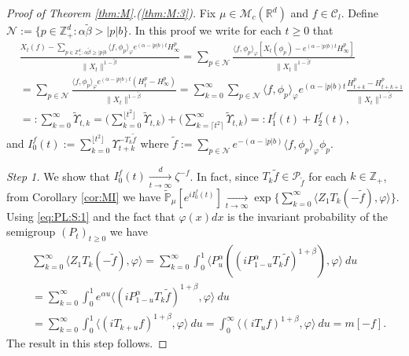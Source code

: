 \documentclass[12pt,a4paper]{amsart}
\theoremstyle{plain}
\theoremstyle{definition}
\numberwithin{equation}{section}
\begin{document}
\begin{proof}[Proof of Theorem \ref{thm:M}.(\ref{thm:M:3})]
Fix $\mu \in \mathcal M_c(\mathbb R^d)$ and $f \in \mathcal C_l$.
Define $\mathcal N:= \{p\in \mathbb Z_+^d: \alpha \tilde \beta > |p|b\}$.
In this proof we write for each $t\geq 0$ that
\begin{align}
  & \frac{X_t(f) - \sum_{p\in \mathbb Z_+^d: \alpha \tilde \beta \geq |p|b} \langle f,\phi_p\rangle_\varphi e^{(\alpha - |p|b)t}H_\infty^p}{\|X_t\|^{1- \tilde \beta}}
    = \sum_{p\in \mathcal N}\frac{ \langle f,\phi_p\rangle_\varphi [X_t(\phi_p) - e^{(\alpha - |p|b)t}H_\infty^p]}{\|X_t\|^{1- \tilde \beta}}
  \\& = \sum_{p \in \mathcal N} \frac{\langle f,\phi_p\rangle_\varphi e^{(\alpha - |p|b)t}(H_t^p - H_\infty^p)}{\|X_t\|^{1- \tilde \beta}}
   = \sum_{k=0}^\infty \sum_{p \in \mathcal N}  \langle f,\phi_p\rangle_\varphi e^{(\alpha - |p|b)t}\frac{ H_{t+k}^p - H_{t+k+1}^p}{\|X_t\|^{1- \tilde \beta}}
  \\ & =: \sum_{k=0}^\infty \widetilde \Upsilon_{t,k}
  = \Big(\sum_{k = 0}^{\lfloor t^2 \rfloor}  \widetilde \Upsilon_{t,k} \Big) + \Big(\sum_{k = \lceil t^2 \rceil}^\infty  \widetilde \Upsilon_{t,k}\Big)
  = : I^f_1(t) + I^f_2(t),
\end{align}
and $I^f_0(t):= \sum_{k = 0}^{\lfloor t^2 \rfloor} \Upsilon_{t+k}^{- T_k \tilde f}$ where $\tilde f := \sum_{p\in \mathcal N} e^{-(\alpha - |p|b)}\langle f, \phi_p \rangle_\varphi \phi_p$.

\emph{Step 1.} We show that $I^f_0(t) \xrightarrow [t\to \infty]{d} \zeta^{-f}$.
In fact, since $T_k\tilde f \in \mathcal P_{\tilde f}$ for each $k\in \mathbb Z_+$, from Corollary \ref{cor:MI} we have $\widetilde{ \mathbb P}_\mu[e^{i I_0^f(t)}]\xrightarrow[t\to \infty]{}\exp\{\sum_{k=0}^\infty \langle Z_1T_k(-\tilde f),\varphi\rangle\}$.
Using \eqref{eq:PL:S:1} and the fact that $\varphi(x)dx$ is the invariant probability
of the semigroup $(P_t)_{t\geq 0}$ we have
\begin{align}
  \label{eq:PM:CLTS:2}
  & \sum_{k=0}^\infty \langle Z_1 T_{k} (-\tilde f), \varphi \rangle
    = \sum_{k=0}^\infty \int_0^1 \langle P_u^\alpha ((iP_{1 - u}^\alpha T_k \tilde f)^{1+\beta}), \varphi\rangle ~du
  \\& = \sum_{k=0}^\infty \int_0^1 e^{\alpha u} \langle  (iP_{1 - u}^\alpha T_{k}\tilde f)^{1+\beta}, \varphi \rangle ~du
  \\& = \sum_{k=0}^\infty \int_0^1 \langle  (iT_{k+ u} f)^{1+\beta}, \varphi\rangle~du
  = \int_0^\infty \langle  (iT_{u} f)^{1+\beta}, \varphi\rangle~du = m[-f].
\end{align}
The result in this step follows.


\end{proof}
\end{document}
